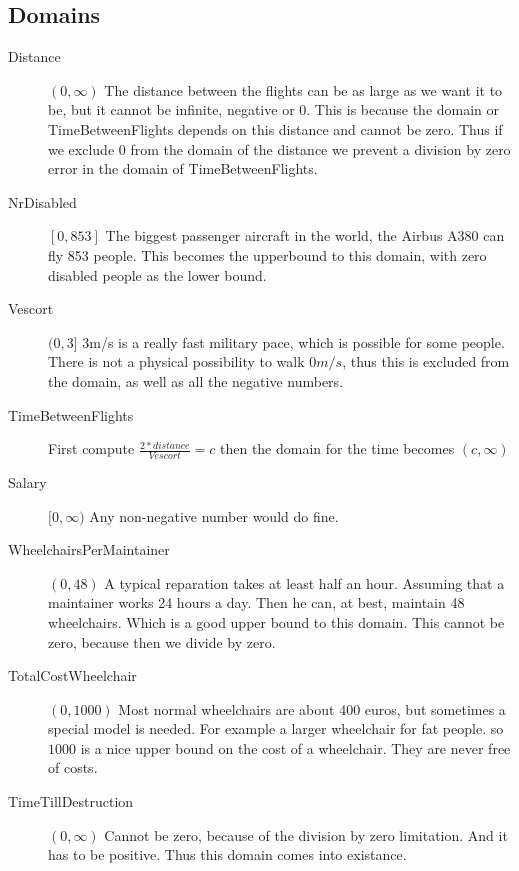 \documentclass[a4paper, 11pt, notitlepage]{report}
\begin{document}
\subsection{Domains}
	\begin{description}
		\item[Distance] $(0,\infty)$ The distance between the flights can be as large as we want it to be, but it cannot be infinite, negative or 0. This is because the domain or TimeBetweenFlights depends on this distance and cannot be zero. Thus if we exclude 0 from the domain of the distance we prevent a division by zero error in the domain of TimeBetweenFlights.
		\item[NrDisabled] $[0,853 ]$ The biggest passenger aircraft in the world, the Airbus A380 can fly 853 people. This becomes the upperbound to this domain, with zero disabled people as the lower bound.   %
		\item[Vescort] $(0,3]$ 3m/s is a really fast military pace, which is possible for some people. There is not a physical possibility to walk $0m/s$, thus this is excluded from the domain, as well as all the negative numbers.
		\item[TimeBetweenFlights] First compute $\frac{2*distance}{Vescort} = c$ then the domain for the time becomes $(c,\infty)$ %
		\item[Salary] $[0,\infty)$ Any non-negative number would do fine.
		\item[WheelchairsPerMaintainer] $(0,48)$ A typical reparation takes at least half an hour. Assuming that a maintainer works 24 hours a day. Then he can, at best, maintain 48 wheelchairs. Which is a good upper bound to this domain. This cannot be zero, because then we divide by zero.
		\item[TotalCostWheelchair] $(0,1000)$ Most normal wheelchairs are about $400$ euros, but sometimes a special model is needed. For example a larger wheelchair for fat people. so $1000$ is a nice upper bound on the cost of a wheelchair. They are never free of costs. %
		\item[TimeTillDestruction] $(0,\infty)$ Cannot be zero, because of the division by zero limitation. And it has to be positive. Thus this domain comes into existance.
	\end{description}
	
	
\end{document}
